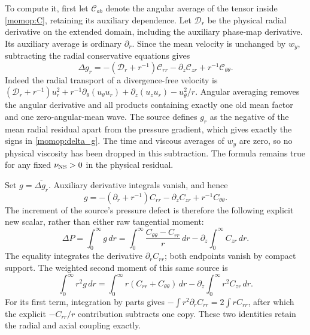 \documentclass[11pt]{article}
\begin{document}
To compute it, first let $\mathcal C_{ab}$ denote the angular average
of the tensor inside \eqref{momop:C}, retaining its auxiliary dependence.
Let $\mathcal D_r$ be the physical radial derivative on the extended
domain, including the auxiliary phase-map derivative. Its auxiliary
average is ordinary $\partial_r$. Since the mean velocity is unchanged
by $w_y$, subtracting the radial conservative equations gives
\begin{equation}\label{momop:delta_g}
 \Delta g_r=-(\mathcal D_r+r^{-1})\mathcal C_{rr}
                   -\partial_z\mathcal C_{zr}
                   +r^{-1}\mathcal C_{\theta\theta}.
\end{equation}
Indeed the radial transport of a divergence-free velocity is
$(\mathcal D_r+r^{-1})u_r^2+
r^{-1}\partial_\theta(u_\theta u_r)+
\partial_z(u_zu_r)-u_\theta^2/r$.
Angular averaging removes the angular derivative and all products
containing exactly one old mean factor and one zero-angular-mean wave.
The source defines $g_r$ as the negative of the mean radial residual
apart from the pressure gradient, which gives exactly the signs in
\eqref{momop:delta_g}. The time and viscous averages of $w_y$
are zero, so no physical viscosity has been dropped in this subtraction.
The formula remains true for any fixed $\nu_{\rm NS}>0$ in the
physical residual.

Set $g=\overline{\Delta g_r}$. Auxiliary derivative integrals vanish,
and hence
\begin{equation}\label{momop:gbar}
 g=-(\partial_r+r^{-1})C_{rr}-\partial_zC_{zr}
                                    +r^{-1}C_{\theta\theta}.
\end{equation}
The increment of the source's pressure defect is therefore the
following explicit new scalar, rather than either raw tangential moment:
\begin{equation}\label{momop:deltaP}
 \Delta P=\int_0^\infty g\,dr
 =\int_0^\infty\frac{C_{\theta\theta}-C_{rr}}r\,dr
                           -\partial_z\int_0^\infty C_{zr}\,dr .
\end{equation}
The equality integrates the derivative $\partial_rC_{rr}$;
both endpoints vanish by compact support. The weighted second
moment of this same source is
\begin{equation}\label{momop:gsecond}
 \int_0^\infty r^2g\,dr
 =\int_0^\infty r(C_{rr}+C_{\theta\theta})\,dr
                   -\partial_z\int_0^\infty r^2C_{zr}\,dr .
\end{equation}
For its first term, integration by parts gives
$-\int r^2\partial_rC_{rr}=2\int rC_{rr}$, after which the
explicit $-C_{rr}/r$ contribution subtracts one copy.
These two identities retain the radial and axial coupling exactly.
\end{document}
